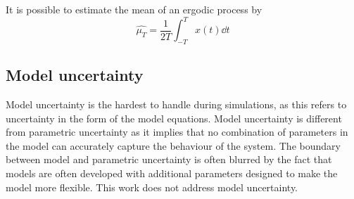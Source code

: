 It is possible to estimate the mean of an ergodic process by 
\begin{equation}
  \hat{\mu_T} = \frac{1}{2T} \int_{-T}^{T} x(t) \dd t
\end{equation}


\subsection{Model uncertainty}
Model uncertainty is the hardest to handle during simulations, as this
refers to uncertainty in the form of the model equations.  Model
uncertainty is different from parametric uncertainty as it implies
that no combination of parameters in the model can accurately capture
the behaviour of the system.  The boundary between model and
parametric uncertainty is often blurred by the fact that models are
often developed with additional parameters designed to make the model
more flexible.  This work does not address model uncertainty.



